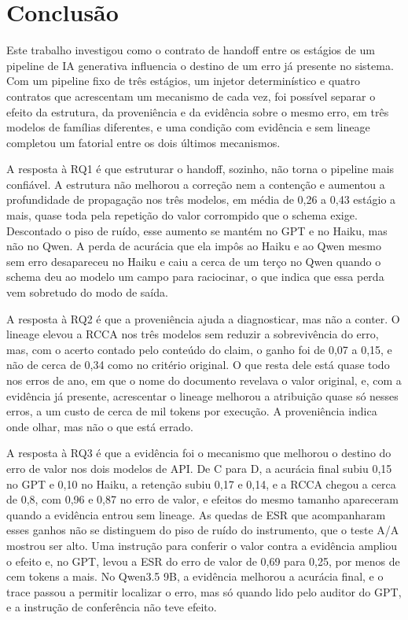\section{Conclusão}\label{sec:conclusao}

Este trabalho investigou como o contrato de handoff entre os estágios de um pipeline de IA generativa influencia o destino de um erro já presente no sistema.
Com um pipeline fixo de três estágios, um injetor determinístico e quatro contratos que acrescentam um mecanismo de cada vez, foi possível separar o efeito da estrutura, da proveniência e da evidência sobre o mesmo erro, em três modelos de famílias diferentes, e uma condição com evidência e sem lineage completou um fatorial entre os dois últimos mecanismos.

A resposta à RQ1 é que estruturar o handoff, sozinho, não torna o pipeline mais confiável.
A estrutura não melhorou a correção nem a contenção e aumentou a profundidade de propagação nos três modelos, em média de 0,26 a 0,43 estágio a mais, quase toda pela repetição do valor corrompido que o schema exige. Descontado o piso de ruído, esse aumento se mantém no GPT e no Haiku, mas não no Qwen.
A perda de acurácia que ela impôs ao Haiku e ao Qwen mesmo sem erro desapareceu no Haiku e caiu a cerca de um terço no Qwen quando o schema deu ao modelo um campo para raciocinar, o que indica que essa perda vem sobretudo do modo de saída.

A resposta à RQ2 é que a proveniência ajuda a diagnosticar, mas não a conter.
O lineage elevou a RCCA nos três modelos sem reduzir a sobrevivência do erro, mas, com o acerto contado pelo conteúdo do claim, o ganho foi de 0,07 a 0,15, e não de cerca de 0,34 como no critério original.
O que resta dele está quase todo nos erros de ano, em que o nome do documento revelava o valor original, e, com a evidência já presente, acrescentar o lineage melhorou a atribuição quase só nesses erros, a um custo de cerca de mil tokens por execução.
A proveniência indica onde olhar, mas não o que está errado.

A resposta à RQ3 é que a evidência foi o mecanismo que melhorou o destino do erro de valor nos dois modelos de API.
De C para D, a acurácia final subiu 0,15 no GPT e 0,10 no Haiku, a retenção subiu 0,17 e 0,14, e a RCCA chegou a cerca de 0,8, com 0,96 e 0,87 no erro de valor, e efeitos do mesmo tamanho apareceram quando a evidência entrou sem lineage.
As quedas de ESR que acompanharam esses ganhos não se distinguem do piso de ruído do instrumento, que o teste A/A mostrou ser alto.
Uma instrução para conferir o valor contra a evidência ampliou o efeito e, no GPT, levou a ESR do erro de valor de 0,69 para 0,25, por menos de cem tokens a mais.
No Qwen3.5 9B, a evidência melhorou a acurácia final, e o trace passou a permitir localizar o erro, mas só quando lido pelo auditor do GPT, e a instrução de conferência não teve efeito.

